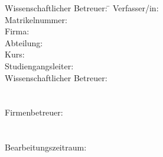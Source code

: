 \begin{titlepage}
\begin{center}
\begin{minipage}{\textwidth}
			\begin{tabbing}
				Wissenschaftlicher Betreuer: \hspace{0.85cm}\=\kill
				Verfasser/in: \> \varName \\[1.5mm]
				Matrikelnummer: \> \varMatriculationNumber \\[1.5mm]
				Firma: \> \varCompany \\[1.5mm]
				Abteilung: \> \varDepartment \\[1.5mm]
				Kurs: \> \varCourse \\[1.5mm]
				Studiengangsleiter: \> \varCourseDirector  \\[1.5mm]
				Wissenschaftlicher Betreuer: \> \varScientificAdvisor \\
				\> \varScientificAdvisorMail \\
				\> \varScientificAdvisorNumber \\[1.5mm]
				Firmenbetreuer: \> \varCompanySupervisor \\
				\> \varCompanySupervisorMail \\
				\> \varCompanySupervisorNumber \\[1.5mm]
				Bearbeitungszeitraum: \> \varTimeframe
			\end{tabbing}
		\end{minipage}
		
	\end{center}
	
\end{titlepage}